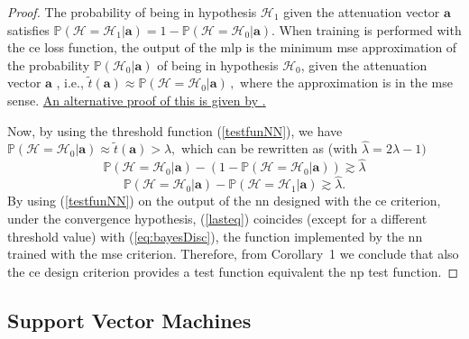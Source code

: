 \documentclass[final,twocolumn]{IEEEtran}
\begin{document}
\begin{proof}
The probability of being in hypothesis $\mathcal{H}_1$ given the attenuation vector $\bm{a}$ satisfies
$
    \mathbb{P}(\mathcal{H} = \mathcal{H}_1|\bm{a} ) = 1- \mathbb{P}(\mathcal{H} = \mathcal{H}_0|\bm{a} ).
$
When training is performed with the \ac{ce} loss function, the output of the \ac{mlp} is the minimum \ac{mse} approximation of the probability $\mathbb{P}(\mathcal{H}_0|\bm{a})$ of being in hypothesis $\mathcal{H}_0$, given the attenuation vector $\bm{a}$ \underline{\cite[Section~5.2]{Bishop2006}}, i.e.,
$
    \tilde{t}(\bm{a}) \approx \mathbb{P}(\mathcal{H}=\mathcal{H}_0|\bm{a})\,,
$
where the approximation is in the \ac{mse} sense. \uline{An alternative proof of this is given by \cite{nostro}.}

Now, by using the threshold function (\ref{testfunNN}), we have $
    \mathbb{P}(\mathcal{H}=\mathcal{H}_0|\bm{a}) \approx  \tilde{t}(\bm{a}) > \lambda,
$ which can be rewritten as (with $\hat{\lambda}=2\lambda-1)$
\begin{equation}
    \mathbb{P}(\mathcal{H}=\mathcal{H}_0|\bm{a} )-(1-\mathbb{P}(\mathcal{H}=\mathcal{H}_0|\bm{a} )) \gtrsim \hat{\lambda}
\end{equation}
\begin{equation}
\label{lasteq}
    \mathbb{P}(\mathcal{H}=\mathcal{H}_0|\bm{a} )-\mathbb{P}(\mathcal{H}=\mathcal{H}_1|\bm{a} ) \gtrsim \hat{\lambda}.
\end{equation}
By using (\ref{testfunNN}) on the output of the \ac{nn} designed with the \ac{ce} criterion, under the convergence hypothesis, (\ref{lasteq}) coincides (except for a different threshold value) with (\ref{eq:bayesDisc}), the function implemented by the \ac{nn} trained with the \ac{mse} criterion. Therefore, from Corollary~1 we conclude that also the \ac{ce} design criterion provides a test function equivalent the \ac{np} test function.
\end{proof}

\subsection{Support Vector Machines}\label{sec:svm}
\end{document}
